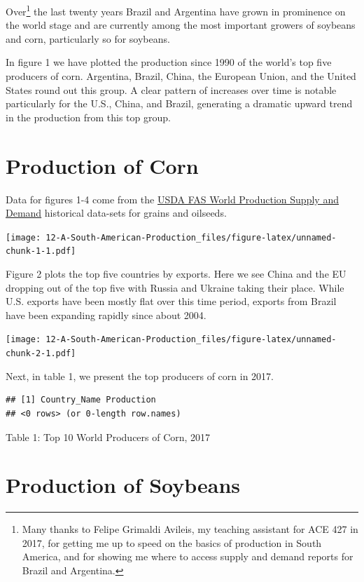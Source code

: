 \documentclass[
]{book}
\begin{document}
Over\footnote{Many thanks to Felipe Grimaldi Avileis, my teaching assistant for ACE 427 in 2017, for getting me up to speed on the basics of production in South America, and for showing me where to access supply and demand reports for Brazil and Argentina.} the last twenty years Brazil and Argentina have grown in prominence on the world stage and are currently among the most important growers of soybeans and corn, particularly so for soybeans.

In figure 1 we have plotted the production since 1990 of the world's top five producers of corn. Argentina, Brazil, China, the European Union, and the United States round out this group. A clear pattern of increases over time is notable particularly for the U.S., China, and Brazil, generating a dramatic upward trend in the production from this top group.

\hypertarget{production-of-corn}{%
\section{Production of Corn}\label{production-of-corn}}

Data for figures 1-4 come from the \href{https://apps.fas.usda.gov/psdonline/app/index.html\#/app/downloads}{USDA FAS World Production Supply and Demand} historical data-sets for grains and oilseeds.

\texttt{[image: 12-A-South-American-Production\_files/figure-latex/unnamed-chunk-1-1.pdf]}

Figure 2 plots the top five countries by exports. Here we see China and the EU dropping out of the top five with Russia and Ukraine taking their place. While U.S. exports have been mostly flat over this time period, exports from Brazil have been expanding rapidly since about 2004.

\texttt{[image: 12-A-South-American-Production\_files/figure-latex/unnamed-chunk-2-1.pdf]}

Next, in table 1, we present the top producers of corn in 2017.

\begin{verbatim}
## [1] Country_Name Production  
## <0 rows> (or 0-length row.names)
\end{verbatim}

Table 1: Top 10 World Producers of Corn, 2017

\hypertarget{production-of-soybeans}{%
\section{Production of Soybeans}\label{production-of-soybeans}}
\end{document}
